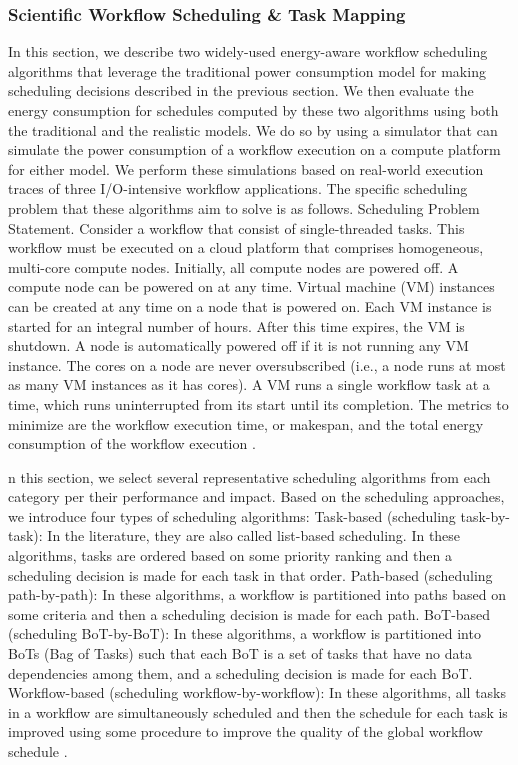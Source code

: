\subsubsection{Scientific Workflow Scheduling \& Task Mapping}
\label{sec:background_colocation_scheduling}
In this section, we describe two widely-used energy-aware workflow scheduling algorithms that leverage the traditional power consumption model for making scheduling decisions described in the previous section. We then evaluate the energy consumption for schedules computed by these two algorithms using both the traditional and the realistic models. We do so by using a simulator that can simulate the power consumption of a workflow execution on a compute platform for either model. We perform these simulations based on real-world execution traces of three I/O-intensive workflow applications. The specific scheduling problem that these algorithms aim to solve is as follows.
Scheduling Problem Statement. Consider a workflow that consist of single-threaded tasks. This workflow must be executed on a cloud platform that comprises homogeneous, multi-core compute nodes. Initially, all compute nodes are powered off. A compute node can be powered on at any time. Virtual machine (VM) instances can be created at any time on a node that is powered on. Each VM instance is started for an integral number of hours. After this time expires, the VM is shutdown. A node is automatically powered off if it is not running any VM instance. The cores on a node are never oversubscribed (i.e., a node runs at most as many VM instances as it has cores). A VM runs a single workflow task at a time, which runs uninterrupted from its start until its completion. The metrics to minimize are the workflow execution time, or makespan, and the total energy consumption of the workflow execution \cite{HosseiniShirvani2024}.

n this section, we select several representative scheduling algorithms from each category per their performance and impact. Based on the scheduling approaches, we introduce four types of scheduling algorithms:
Task-based (scheduling task-by-task): In the literature, they are also called list-based scheduling. In these algorithms, tasks are ordered based on some priority ranking and then a scheduling decision is made for each task in that order. Path-based (scheduling path-by-path): In these algorithms, a workflow is partitioned into paths based on some criteria and then a scheduling decision is made for each path.
BoT-based (scheduling BoT-by-BoT): In these algorithms, a workflow is partitioned into BoTs (Bag of Tasks) such that each BoT is a set of tasks that have no data dependencies among them, and a scheduling decision is made for each BoT.
Workflow-based (scheduling workflow-by-workflow): In these algorithms, all tasks in a workflow are simultaneously scheduled and then the schedule for each task is improved using some procedure to improve the quality of the global workflow schedule \cite{a survery}.

